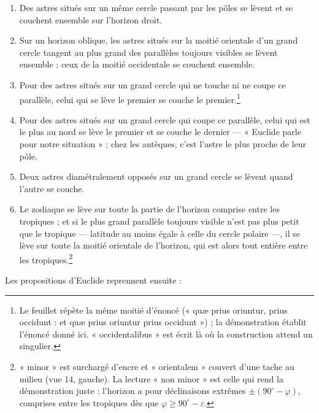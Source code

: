 \documentclass[11pt,a4paper]{article}
\begin{document}
\begin{enumerate}
  \item[4.] Des astres situés sur un même cercle passant par les pôles se lèvent
    et se couchent ensemble sur l'horizon droit.
  \item[5.] Sur un horizon oblique, les astres situés sur la moitié orientale
    d'un grand cercle tangent au plus grand des parallèles toujours visibles se
    lèvent ensemble ; ceux de la moitié occidentale se couchent ensemble.
  \item[6.] Pour des astres situés sur un grand cercle qui ne touche ni ne coupe
    ce parallèle, celui qui se lève le premier se couche le premier.\footnote{Le
    feuillet répète la même moitié d'énoncé (« quæ prius oriuntur, prius
    occidunt : et quæ prius oriuntur prius occidunt ») ; la démonstration
    établit l'énoncé donné ici. « occidentalibus » est écrit là où la
    construction attend un singulier.}
  \item[7.] Pour des astres situés sur un grand cercle qui coupe ce parallèle,
    celui qui est le plus au nord se lève le premier et se couche le dernier —
    « Euclide parle pour notre situation » ; chez les antèques, c'est l'astre le
    plus proche de leur pôle.
  \item[8.] Deux astres diamétralement opposés sur un grand cercle se lèvent
    quand l'autre se couche.
  \item[9.] Le zodiaque se lève sur toute la partie de l'horizon comprise entre
    les tropiques ; et si le plus grand parallèle toujours visible n'est pas plus
    petit que le tropique — latitude au moins égale à celle du cercle polaire —,
    il se lève sur toute la moitié orientale de l'horizon, qui est alors tout
    entière entre les tropiques.\footnote{« minor » est surchargé d'encre et
    « orientalem » couvert d'une tache au milieu (vue 14, gauche). La lecture
    « non minor » est celle qui rend la démonstration juste : l'horizon a pour
    déclinaisons extrêmes $\pm(90^\circ-\varphi)$, comprises entre les
    tropiques dès que $\varphi \ge 90^\circ-\varepsilon$.}
\end{enumerate}

Les propositions d'Euclide reprennent ensuite :
\end{document}

